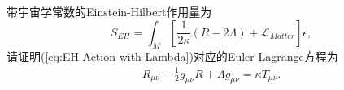         \begin{exercise}
            带宇宙学常数的Einstein-Hilbert作用量为
            \begin{equation}\label{eq:EH Action with Lambda}
                S_{EH}=\int_M\left[\frac{1}{2\kappa}\left(R-2\Lambda\right)+\mathcal{L} _{Matter}\right]\epsilon,
            \end{equation}
            请证明(\ref{eq:EH Action with Lambda})对应的Euler-Lagrange方程为
            \begin{eqnarray}\label{eq:Field Equation with Lambda}
                R_{\mu\nu}-\frac{1}{2}g_{\mu\nu}R+\Lambda g_{\mu\nu}=\kappa T_{\mu\nu}.
            \end{eqnarray}
        \end{exercise}
        
